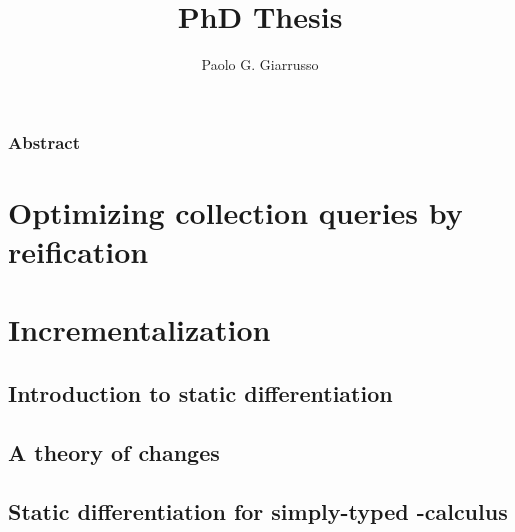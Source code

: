\documentclass{book}
\title{PhD Thesis}
\author{Paolo G. Giarrusso}
\begin{document}
\maketitle


\section*{Abstract}

\tableofcontents



\part{Optimizing collection queries by reification}
\label{sec:ch-aosd13}





\part{Incrementalization}
\label{part:incr}
\chapter{Introduction to static differentiation}


\chapter{A theory of changes}
%


\chapter{Static differentiation for simply-typed \TitleLambda{}-calculus}





% 
% 





\begin{oldSec}

\end{oldSec}
\end{document}

